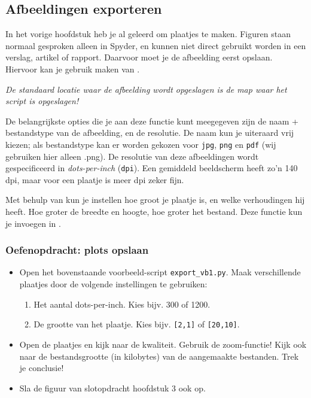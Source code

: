 \documentclass[a4paper,11pt, fleqn]{article}
\begin{document}
\subsection{Afbeeldingen exporteren}
In het vorige hoofdstuk heb je al geleerd om plaatjes te maken. Figuren staan normaal gesproken alleen in Spyder, en kunnen niet direct gebruikt worden in een verslag, artikel of rapport. Daarvoor moet je de afbeelding eerst opslaan. Hiervoor kan je gebruik maken van .

{\it De standaard locatie waar de afbeelding wordt opgeslagen is de map waar het script is opgeslagen!}

De belangrijkste opties die je aan deze functie kunt meegegeven zijn de naam + bestandstype van de afbeelding, en de resolutie. De naam kun je uiteraard vrij kiezen; als bestandstype kan er worden gekozen voor \verb.jpg., \verb.png. en  \verb.pdf. (wij gebruiken hier alleen .png). 
De resolutie van deze afbeeldingen wordt gespecificeerd in \textit{dots-per-inch}  (\verb,dpi,). Een gemiddeld beeldscherm heeft zo'n 140 dpi, maar voor een plaatje is meer dpi zeker fijn.

Met behulp van  kun je instellen hoe groot je plaatje is, en welke verhoudingen hij heeft. Hoe groter de breedte en hoogte, hoe groter het bestand. Deze functie kun je invoegen in .


\subsubsection*{Oefenopdracht: plots opslaan} 
\begin{itemize}
	\item Open het bovenstaande voorbeeld-script \verb,export_vb1.py,. Maak verschillende plaatjes door de volgende instellingen te gebruiken:

	\begin{enumerate}
		\item Het aantal dots-per-inch. Kies bijv. 300 of 1200.
		\item De grootte van het plaatje. Kies bijv. \verb=[2,1]= of \verb=[20,10]=.
	\end{enumerate}

	\item Open de plaatjes en kijk naar de kwaliteit. Gebruik de zoom-functie! Kijk ook naar de bestandsgrootte (in kilobytes) van de aangemaakte bestanden. Trek je conclusie!
	
	\item Sla de figuur van slotopdracht hoofdstuk 3 ook op.
\end{itemize}
\end{document}
